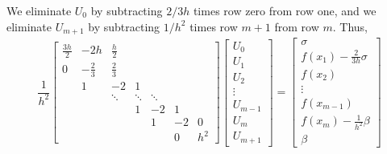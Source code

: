 \documentclass[10pt]{article}
\begin{document}
\begin{solution}[Solution]
\begin{enumerate}
        We eliminate \( U_0 \) by subtracting \( 2/3h \) times row zero from row one, and we eliminate \( U_{m+1} \) by subtracting \( 1/h^2 \) times row \( m+1 \) from row \( m \). Thus,
        \begin{align*}
            \dfrac{1}{h^2}
            \left[\begin{array}{ccccccc}
                \frac{3h}{2} & -2h & \frac{h}{2} \\
                0 & -\frac{2}{3} & \frac{2}{3} \\
                & 1 & -2 & 1 \\
                && \ddots & \ddots & \ddots \\
                &&& 1 & -2 & 1 \\
                &&&& 1 & -2 & 0 \\
                &&&&& 0 & h^2
            \end{array}\right]
            \left[\begin{array}{c}
                U_0 \\ U_1 \\ U_2 \\ \vdots \\ U_{m-1} \\ U_m \\ U_{m+1}
            \end{array}\right]
            =
            \left[\begin{array}{c}
                \sigma \\ f(x_1) - \frac{2}{3h} \sigma \\ f(x_2) \\ \vdots \\ f(x_{m-1}) \\ f(x_m) - \frac{1}{h^2}\beta \\ \beta
            \end{array}\right]
        \end{align*}



\end{enumerate}
\end{solution}
\end{document}
